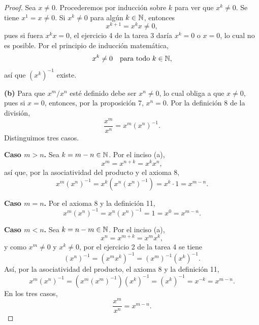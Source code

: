 \documentclass[12pt,a4paper]{article}
\begin{document}
\begin{proof}
        Sea $x\neq0$. Procederemos por inducción sobre $k$ para ver que $x^{k}\neq0$. Se tiene $x^{1}=x\neq0$. Si $x^{k}\neq0$ para algún $k\in\mathbb{N}$, entonces
        \begin{equation*}
            x^{k+1}=x^{k}x\neq0,
        \end{equation*}
        pues si fuera $x^{k}x=0$, el ejercicio 4 de la tarea 3 daría $x^{k}=0$ o $x=0$, lo cual no es posible. Por el principio de inducción matemática,
        \begin{equation*}
            x^{k}\neq0\quad\text{para todo }k\in\mathbb{N},
        \end{equation*}
        así que $\left(x^{k}\right)^{-1}$ existe.

        \textbf{(b)} Para que $x^{m}/x^{n}$ esté definido debe ser $x^{n}\neq0$, lo cual obliga a que $x\neq0$, pues si $x=0$, entonces, por la proposición 7, $x^{n}=0$. Por la definición 8 de la división,
        \begin{equation*}
            \frac{x^{m}}{x^{n}}=x^{m}\left(x^{n}\right)^{-1}.
        \end{equation*}
        Distinguimos tres casos.

        \textbf{Caso $m>n$.} Sea $k=m-n\in\mathbb{N}$. Por el inciso (a),
        \begin{equation*}
            x^{m}=x^{n+k}=x^{k}x^{n},
        \end{equation*}
        así que, por la asociatividad del producto y el axioma 8,
        \begin{equation*}
            x^{m}\left(x^{n}\right)^{-1}=x^{k}\left(x^{n}\left(x^{n}\right)^{-1}\right)=x^{k}\cdot1=x^{m-n}.
        \end{equation*}

        \textbf{Caso $m=n$.} Por el axioma 8 y la definición 11,
        \begin{equation*}
            x^{m}\left(x^{n}\right)^{-1}=x^{n}\left(x^{n}\right)^{-1}=1=x^{0}=x^{m-n}.
        \end{equation*}

        \textbf{Caso $m<n$.} Sea $k=n-m\in\mathbb{N}$. Por el inciso (a),
        \begin{equation*}
            x^{n}=x^{m+k}=x^{m}x^{k},
        \end{equation*}
        y como $x^{m}\neq0$ y $x^{k}\neq0$, por el ejercicio 2 de la tarea 4 se tiene
        \begin{equation*}
            \left(x^{n}\right)^{-1}=\left(x^{m}x^{k}\right)^{-1}=\left(x^{m}\right)^{-1}\left(x^{k}\right)^{-1}.
        \end{equation*}
        Así, por la asociatividad del producto, el axioma 8 y la definición 11,
        \begin{equation*}
            x^{m}\left(x^{n}\right)^{-1}=\left(x^{m}\left(x^{m}\right)^{-1}\right)\left(x^{k}\right)^{-1}=\left(x^{k}\right)^{-1}=x^{-k}=x^{m-n}.
        \end{equation*}
        En los tres casos,
        \begin{equation*}
            \frac{x^{m}}{x^{n}}=x^{m-n}.
        \end{equation*}


\end{proof}
\end{document}
